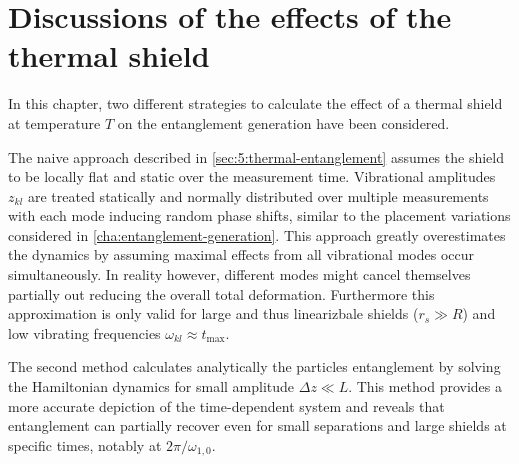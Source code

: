 \section{Discussions of the effects of the thermal shield} \label{sec:5:discussion}

In this chapter, two different strategies to calculate the effect of a thermal shield at temperature $T$ on the entanglement generation have been considered. 

The naive approach described in \cref{sec:5:thermal-entanglement} assumes the shield to be locally flat and static over the measurement time. Vibrational amplitudes $z_{kl}$ are treated statically and normally distributed over multiple measurements with each mode inducing random phase shifts, similar to the placement variations considered in \cref{cha:entanglement-generation}.
This approach greatly overestimates the dynamics by assuming maximal effects from all vibrational modes occur simultaneously. In reality however, different modes might cancel themselves partially out reducing the overall total deformation.
Furthermore this approximation is only valid for large and thus linearizbale shields ($r_s \gg R$) and low vibrating frequencies $\omega_{kl} \approx t_\mathrm{max}$.

The second method calculates analytically the particles entanglement by solving the Hamiltonian dynamics for small amplitude $\Delta z \ll L$. This method provides a more accurate depiction of the time-dependent system and reveals that entanglement can partially recover even for small separations and large shields at specific times, notably at $2\pi/\omega_{1,0}$.

